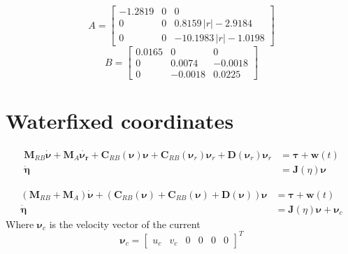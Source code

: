 \documentclass[12pt,a4]{article}
\begin{document}
\begin{equation*}
	A = \left[\begin{array}{ccc} -1.2819 & 0 & 0\\ 0 & 0 & 0.8159\,\left|r\right|-2.9184\\ 0 & 0 & -10.1983\,\left|r\right|-1.0198 \end{array}\right]
\end{equation*}
\begin{equation*}
	B = \left[\begin{array}{ccc} 0.0165 & 0 & 0\\ 0 & 0.0074 & -0.0018\\ 0 & -0.0018 & 0.0225 \end{array}\right]
\end{equation*}





\section{Waterfixed coordinates}

\begin{align}
	\bm{M}_{RB}\bm{\dot{\nu}} + \bm{M}_{A}\bm{\dot{\nu_r}} + \bm{C}_{RB}(\bm{\nu})\bm{\nu} + \bm{C}_{RB}(\bm{\nu}_r)\bm{\nu}_r + \bm{D}(\bm{\nu}_r)\bm{\nu}_r & = \bm{\tau} + \bm{w}(t) \\
	\bm{\dot{\eta}}                                                                                                                                           & = \bm{J}(\eta)\bm{\nu}
\end{align}

\begin{align}
	\left(\bm{M}_{RB} + \bm{M}_{A}  \right) \bm{\dot{\nu}} + \left(\bm{C}_{RB}(\bm{\nu}) + \bm{C}_{RB}(\bm{\nu}) + \bm{D}(\bm{\nu})  \right)\bm{\nu} & = \bm{\tau} + \bm{w}(t)             \\
	\bm{\dot{\eta}}                                                                                                                                  & = \bm{J}(\eta)\bm{\nu} + \bm{\nu}_c
\end{align}
Where $\bm{\nu}_c$ is the velocity vector of the current
\begin{equation}
	\bm{\nu}_c =  \begin{bmatrix}u_c & v_c & 0 & 0 & 0 & 0 \end{bmatrix}^T
\end{equation}
\end{document}

